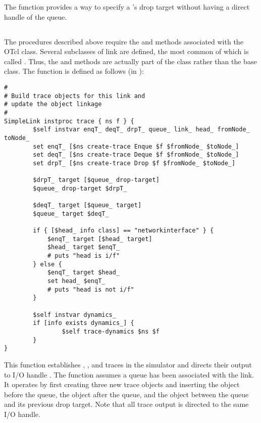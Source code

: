 The  function provides a way to specify a
's drop target without having a direct handle of
the queue.

\subsection{}

The  procedures described above require the 
and  methods associated with the OTcl  class.
Several subclasses of link are defined, the most common of which
is called .  Thus, the  and 
methods are actually part of the  class rather than
the  base class.
The  function is defined as follows (in ):
\begin{small}
\begin{verbatim}
#
# Build trace objects for this link and
# update the object linkage
#
SimpleLink instproc trace { ns f } {
        $self instvar enqT_ deqT_ drpT_ queue_ link_ head_ fromNode_ toNode_
        set enqT_ [$ns create-trace Enque $f $fromNode_ $toNode_]
        set deqT_ [$ns create-trace Deque $f $fromNode_ $toNode_]
        set drpT_ [$ns create-trace Drop $f $fromNode_ $toNode_]

        $drpT_ target [$queue_ drop-target]
        $queue_ drop-target $drpT_

        $deqT_ target [$queue_ target]
        $queue_ target $deqT_

        if { [$head_ info class] == "networkinterface" } {
            $enqT_ target [$head_ target]
            $head_ target $enqT_
            # puts "head is i/f"
        } else {
            $enqT_ target $head_
            set head_ $enqT_
            # puts "head is not i/f"
        }

        $self instvar dynamics_
        if [info exists dynamics_] {
                $self trace-dynamics $ns $f
        }
}

\end{verbatim}
\end{small}

This function establishes , , and 
traces in the simulator  and directs their
output to I/O handle .
The function assumes a queue has been associated with the link.
It operates by first creating three new trace objects
and inserting the  object before the queue, the
 object after the queue, and the  object
between the queue and its previous drop target.
Note that all trace output is directed to the same I/O handle.

